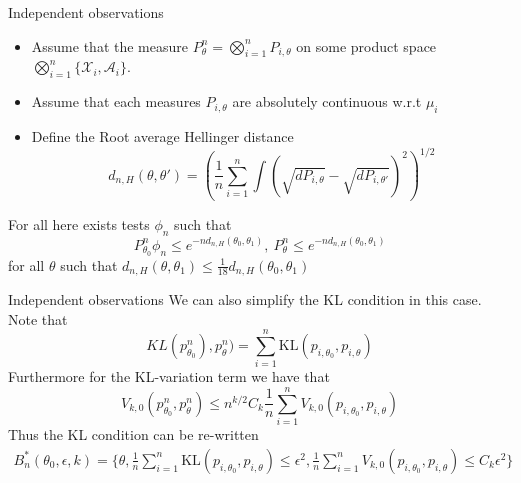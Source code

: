 
\begin{frame}{Independent observations}

\begin{itemize}[<+->]
\item Assume that the measure $P_\theta^n = \bigotimes_{i=1}^{n} P_{i,\theta}$ on some product space $\bigotimes_{i=1}^n \{\mathcal{X}_i, \mathcal{A}_i\}$. 
\item Assume that each measures $P_{i,\theta}$ are absolutely continuous w.r.t $\mu_i$ 
\item Define the Root average Hellinger distance 
$$
d_{n,H} (\theta, \theta') = \left( \frac{1}{n} \sum_{i=1}^n \int (\sqrt{dP_{i,\theta}} - \sqrt{dP_{i,\theta'}})^2 \right)^{1/2}
$$
\end{itemize}
\pause
\begin{lemma}
For all here exists tests $\phi_n$ such that 
$$
P_{\theta_0}^n \phi_n \leq e^{-nd_{n,H}(\theta_0,\theta_1)},~  P_{\theta}^n \leq e^{-nd_{n,H}(\theta_0,\theta_1)}
$$
for all $\theta$ such that $d_{n,H}(\theta,\theta_1) \leq \tfrac{1}{18} d_{n,H}(\theta_0,\theta_1)$
\end{lemma}

\end{frame}


\begin{frame}{Independent observations}
We can also simplify the KL condition in this case. \pause Note that 
$$
KL(p^n_{\theta_0}),p^n_{\theta}) = \sum_{i=1}^n \text{KL}(p_{i,\theta_0},p_{i,\theta})
$$ 
\pause
Furthermore for the KL-variation term we have that 
$$
V_{k,0}(p^n_{\theta_0},p^n_\theta) \leq n^{k/2} C_k \frac{1}{n}\sum_{i=1}^n V_{k,0}(p_{i,\theta_0},p_{i,\theta}) 
$$
\pause
Thus the KL condition can be re-written
\begin{multline*}
B_n^*(\theta_0,\epsilon,k) = \Big\{\theta ,\frac{1}{n} \sum_{i=1}^n \text{KL}(p_{i,\theta_0},p_{i,\theta}) \leq \epsilon^2 , \frac{1}{n} \sum_{i=1}^n V_{k,0}(p_{i,\theta_0},p_{i,\theta})  \leq C_k \epsilon^2 \Big\}
\end{multline*}


\end{frame}



